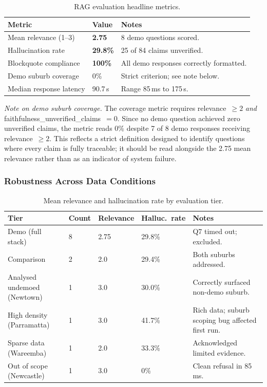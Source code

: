 \documentclass[11pt,a4paper]{article}
\begin{document}
\begin{table}[H]
\centering
\caption{RAG evaluation headline metrics.}
\begin{tabular}{|l|l|l|}
\hline
\textbf{Metric} & \textbf{Value} & \textbf{Notes} \\
\hline
Mean relevance (1--3) & \textbf{2.75} & 8 demo questions scored. \\
\hline
Hallucination rate & \textbf{29.8\%} & 25 of 84 claims unverified. \\
\hline
Blockquote compliance & \textbf{100\%} & All demo responses correctly formatted. \\
\hline
Demo suburb coverage & 0\% & Strict criterion; see note below. \\
\hline
Median response latency & 90.7\,s & Range 85\,ms to 175\,s. \\
\hline
\end{tabular}
\label{tab:eval-headline}
\end{table}

\textit{Note on demo suburb coverage.} The coverage metric requires relevance~$\ge 2$ \textit{and} faithfulness\_unverified\_claims~$= 0$. Since no demo question achieved zero unverified claims, the metric reads 0\% despite 7 of 8 demo responses receiving relevance~$\ge 2$. This reflects a strict definition designed to identify questions where every claim is fully traceable; it should be read alongside the 2.75 mean relevance rather than as an indicator of system failure.

\subsubsection{Robustness Across Data Conditions}

\begin{table}[H]
\centering
\caption{Mean relevance and hallucination rate by evaluation tier.}
\begin{tabular}{|L{0.28\textwidth}|L{0.08\textwidth}|L{0.15\textwidth}|L{0.15\textwidth}|L{0.22\textwidth}|}
\hline
\textbf{Tier} & \textbf{Count} & \textbf{Relevance} & \textbf{Halluc.\ rate} & \textbf{Notes} \\
\hline
Demo (full stack) & 8 & 2.75 & 29.8\% & Q7 timed out; excluded. \\
\hline
Comparison & 2 & 2.0 & 29.4\% & Both suburbs addressed. \\
\hline
Analysed undemoed (Newtown) & 1 & 3.0 & 30.0\% & Correctly surfaced non-demo suburb. \\
\hline
High density (Parramatta) & 1 & 3.0 & 41.7\% & Rich data; suburb scoping bug affected first run. \\
\hline
Sparse data (Wareemba) & 1 & 2.0 & 33.3\% & Acknowledged limited evidence. \\
\hline
Out of scope (Newcastle) & 1 & 3.0 & 0\% & Clean refusal in 85\,ms. \\
\hline
\end{tabular}
\label{tab:eval-tiers-results}
\end{table}
\end{document}
